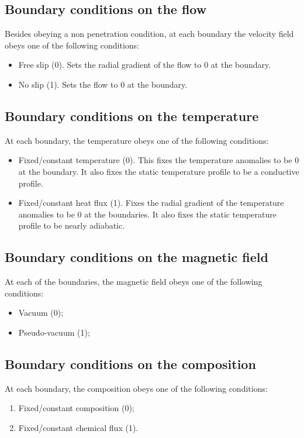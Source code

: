 \documentclass[a4paper,10pt]{book}
\begin{document}
\subsection{Boundary conditions on the flow}
Besides obeying a non penetration condition, at each boundary the velocity
field obeys one of the following conditions:
\begin{itemize}
\item Free slip (0). Sets the radial gradient of the flow to 0 at the boundary.
\item No slip (1). Sets the flow to 0 at the boundary.
\end{itemize}

\subsection{Boundary conditions on the temperature}
At each boundary, the temperature obeys one of the following conditions:
\begin{itemize}
 \item Fixed/constant temperature (0).
       This fixes the temperature anomalies to be 0 at the boundary.
       It also fixes the static temperature profile to be a conductive profile.
 \item Fixed/constant heat flux (1).
       Fixes the radial gradient of the temperature anomalies to be 0 at
       the boundaries. It also fixes the static temperature profile to be
       nearly adiabatic.
\end{itemize}

\subsection{Boundary conditions on the magnetic field}
At each of the boundaries, the magnetic field obeys one of the following
conditions:
\begin{itemize}
 \item Vacuum (0);
 \item Pseudo-vacuum (1);
\end{itemize}

\subsection{Boundary conditions on the composition}
At each boundary, the composition obeys one of the following conditions:
\begin{enumerate}
 \item Fixed/constant composition (0);
 \item Fixed/constant chemical flux (1).
\end{enumerate}
\end{document}

